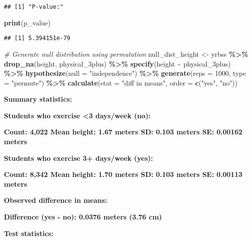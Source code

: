 \documentclass[
]{article}
\newenvironment{Shaded}{\begin{snugshade}}{\end{snugshade}}
\newcommand{\AttributeTok}[1]{\textcolor[rgb]{0.13,0.29,0.53}{#1}}
\newcommand{\CommentTok}[1]{\textcolor[rgb]{0.56,0.35,0.01}{\textit{#1}}}
\newcommand{\DecValTok}[1]{\textcolor[rgb]{0.00,0.00,0.81}{#1}}
\newcommand{\FunctionTok}[1]{\textcolor[rgb]{0.13,0.29,0.53}{\textbf{#1}}}
\newcommand{\NormalTok}[1]{#1}
\newcommand{\OtherTok}[1]{\textcolor[rgb]{0.56,0.35,0.01}{#1}}
\newcommand{\SpecialCharTok}[1]{\textcolor[rgb]{0.81,0.36,0.00}{\textbf{#1}}}
\newcommand{\StringTok}[1]{\textcolor[rgb]{0.31,0.60,0.02}{#1}}
\begin{document}
\begin{verbatim}
## [1] "P-value:"
\end{verbatim}

\begin{Shaded}
\begin{Highlighting}[]
\FunctionTok{print}\NormalTok{(p\_value)}
\end{Highlighting}
\end{Shaded}

\begin{verbatim}
## [1] 5.394151e-79
\end{verbatim}

\begin{Shaded}
\begin{Highlighting}[]
\CommentTok{\# Generate null distribution using permutation}
\NormalTok{null\_dist\_height }\OtherTok{\textless{}{-}}\NormalTok{ yrbss }\SpecialCharTok{\%\textgreater{}\%}
  \FunctionTok{drop\_na}\NormalTok{(height, physical\_3plus) }\SpecialCharTok{\%\textgreater{}\%}
  \FunctionTok{specify}\NormalTok{(height }\SpecialCharTok{\textasciitilde{}}\NormalTok{ physical\_3plus) }\SpecialCharTok{\%\textgreater{}\%}
  \FunctionTok{hypothesize}\NormalTok{(}\AttributeTok{null =} \StringTok{"independence"}\NormalTok{) }\SpecialCharTok{\%\textgreater{}\%}
  \FunctionTok{generate}\NormalTok{(}\AttributeTok{reps =} \DecValTok{1000}\NormalTok{, }\AttributeTok{type =} \StringTok{"permute"}\NormalTok{) }\SpecialCharTok{\%\textgreater{}\%}
  \FunctionTok{calculate}\NormalTok{(}\AttributeTok{stat =} \StringTok{"diff in means"}\NormalTok{, }\AttributeTok{order =} \FunctionTok{c}\NormalTok{(}\StringTok{"yes"}\NormalTok{, }\StringTok{"no"}\NormalTok{))}
\end{Highlighting}
\end{Shaded}

\textbf{Summary statistics:}

\textbf{Students who exercise \textless3 days/week (no):}

\textbf{Count: 4,022 Mean height: 1.67 meters SD: 0.103 meters SE:
0.00162 meters}

\textbf{Students who exercise 3+ days/week (yes):}

\textbf{Count: 8,342 Mean height: 1.70 meters SD: 0.103 meters SE:
0.00113 meters}

\textbf{Observed difference in means:}

\textbf{Difference (yes - no): 0.0376 meters (3.76 cm)}

\textbf{Test statistics:}
\end{document}
